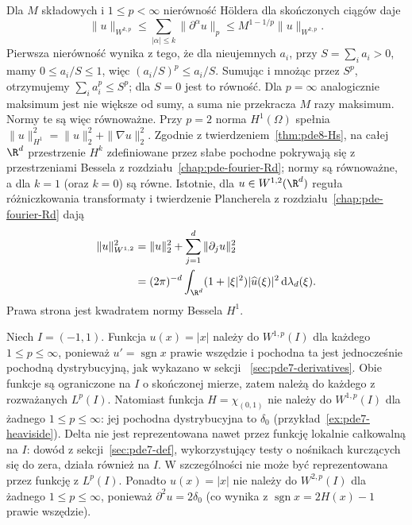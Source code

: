 \begin{uwaga}
Dla $M$ składowych i $1\le p<\infty$ nierówność
Höldera dla skończonych ciągów daje
\[
 \|u\|_{W^{k,p}}\le\sum_{|\alpha|\le k}\|\partial^\alpha u\|_p
 \le M^{1-1/p}\|u\|_{W^{k,p}}.
\]
Pierwsza nierówność wynika z tego, że dla nieujemnych
$a_i$, przy $S=\sum_i a_i>0$, mamy
$0\le a_i/S\le1$, więc $(a_i/S)^p\le a_i/S$.
Sumując i mnożąc przez $S^p$, otrzymujemy
$\sum_i a_i^p\le S^p$; dla $S=0$ jest to równość.
Dla $p=\infty$ analogicznie maksimum jest nie większe
od sumy, a suma nie przekracza $M$ razy maksimum.
Normy te są więc równoważne.
Przy $p=2$ norma $H^1(\Omega)$ spełnia
$\|u\|_{H^1}^2=\|u\|_2^2+\|\nabla u\|_2^2$.
Zgodnie z twierdzeniem~\ref{thm:pde8-Hs}, na całej $\R^d$
przestrzenie $H^k$ zdefiniowane przez słabe pochodne pokrywają się
z przestrzeniami Bessela z rozdziału~\ref{chap:pde-fourier-Rd};
normy są równoważne, a dla $k=1$ (oraz $k=0$)
są równe. Istotnie, dla $u\in W^{1,2}(\R^d)$ reguła
różniczkowania transformaty i twierdzenie Plancherela
z rozdziału~\ref{chap:pde-fourier-Rd} dają
\[
 \begin{aligned}
 \|u\|_{W^{1,2}}^2
 &=\|u\|_2^2+\sum_{j=1}^d\|\partial_j u\|_2^2\\
 &=(2\pi)^{-d}\int_{\R^d}(1+|\xi|^2)|\widehat u(\xi)|^2
 \,\mathrm d\lambda_d(\xi).
 \end{aligned}
\]
Prawa strona jest kwadratem normy Bessela $H^1$.
\end{uwaga}

\begin{przyklad}
Niech $I=(-1,1)$. Funkcja $u(x)=|x|$ należy do $W^{1,p}(I)$
dla każdego $1\le p\le\infty$, ponieważ
$u'=\operatorname{sgn}x$ prawie wszędzie i pochodna ta jest
jednocześnie pochodną dystrybucyjną, jak wykazano w sekcji
~\ref{sec:pde7-derivatives}. Obie funkcje są ograniczone na $I$
o skończonej mierze, zatem należą do każdego z rozważanych
$L^p(I)$. Natomiast funkcja
$H=\chi_{(0,1)}$ nie należy do $W^{1,p}(I)$ dla żadnego
$1\le p\le\infty$: jej pochodna dystrybucyjna to $\delta_0$
(przykład~\ref{ex:pde7-heaviside}). Delta nie jest reprezentowana
nawet przez funkcję lokalnie całkowalną na $I$:
dowód z sekcji~\ref{sec:pde7-def}, wykorzystujący testy
o nośnikach kurczących się do zera, działa również na $I$.
W szczególności nie może być reprezentowana przez funkcję z $L^p(I)$.
Ponadto $u(x)=|x|$ nie należy do $W^{2,p}(I)$ dla żadnego
$1\le p\le\infty$, ponieważ $\partial^2 u=2\delta_0$
(co wynika z $\operatorname{sgn}x=2H(x)-1$ prawie wszędzie).
\end{przyklad}

